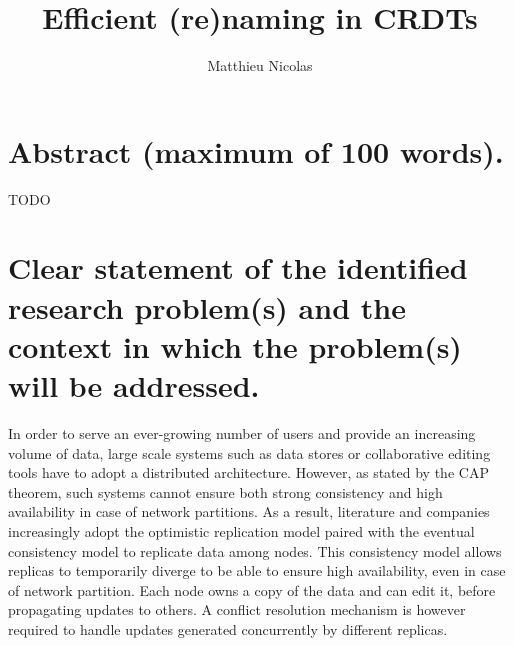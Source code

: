 \documentclass{article}
\title{Efficient (re)naming in \acp{CRDT}}
\author{Matthieu Nicolas \\ \email{matthieu.nicolas@inria.fr}}
\affil{Inria, F-54600,
    Université de Lorraine, LORIA, F-54506,
    CNRS, F-54506}
\date{}
\begin{document}
\maketitle

\section{Abstract (maximum of 100 words).}

TODO

\section{Clear statement of the identified research problem(s) and the context in which the problem(s) will be addressed.}


In order to serve an ever-growing number of users and provide an increasing volume of data,
large scale systems such as data stores or collaborative editing tools have to adopt a distributed architecture.
However, as stated by the CAP theorem, such systems cannot ensure both strong consistency and high availability in case of network partitions.
As a result, literature and companies increasingly adopt the optimistic replication model paired with the eventual consistency model to replicate data among nodes.
This consistency model allows replicas to temporarily diverge to be able to ensure high availability, even in case of network partition.
Each node owns a copy of the data and can edit it, before propagating updates to others.
A conflict resolution mechanism is however required to handle updates generated concurrently by different replicas.
\end{document}
